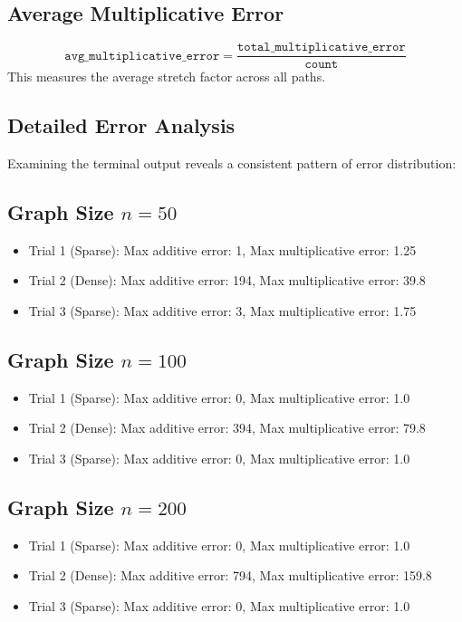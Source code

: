 \documentclass[a4paper,11pt,oneside]{book}
\begin{document}
\subsection{Average Multiplicative Error}
\[
\texttt{avg\_multiplicative\_error} = \frac{\texttt{total\_multiplicative\_error}}{\texttt{count}}
\]
This measures the average stretch factor across all paths.

\subsection{Detailed Error Analysis}

Examining the terminal output reveals a consistent pattern of error distribution:

\subsection{Graph Size $n=50$}
\begin{itemize}
    \item Trial 1 (Sparse): Max additive error: 1, Max multiplicative error: 1.25
    \item Trial 2 (Dense): Max additive error: 194, Max multiplicative error: 39.8
    \item Trial 3 (Sparse): Max additive error: 3, Max multiplicative error: 1.75
\end{itemize}

\subsection{Graph Size $n=100$}
\begin{itemize}
    \item Trial 1 (Sparse): Max additive error: 0, Max multiplicative error: 1.0
    \item Trial 2 (Dense): Max additive error: 394, Max multiplicative error: 79.8
    \item Trial 3 (Sparse): Max additive error: 0, Max multiplicative error: 1.0
\end{itemize}

\subsection{Graph Size $n=200$}
\begin{itemize}
    \item Trial 1 (Sparse): Max additive error: 0, Max multiplicative error: 1.0
    \item Trial 2 (Dense): Max additive error: 794, Max multiplicative error: 159.8
    \item Trial 3 (Sparse): Max additive error: 0, Max multiplicative error: 1.0
\end{itemize}
\end{document}
